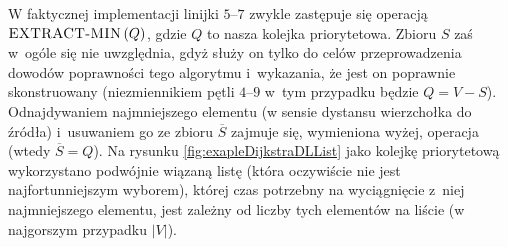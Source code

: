 W faktycznej implementacji linijki $5$--$7$ zwykle zastępuje się operacją $\textrm{\textsc{EXTRACT-MIN}} \left( Q \right)$, gdzie $Q$ to nasza kolejka priorytetowa. Zbioru $S$ zaś w~ogóle się nie uwzględnia, gdyż służy on tylko do celów przeprowadzenia dowodów poprawności tego algorytmu i~wykazania, że jest on poprawnie skonstruowany (niezmiennikiem pętli $4$--$9$ w~tym przypadku będzie $Q = V - S$). Odnajdywaniem najmniejszego elementu (w sensie dystansu wierzchołka do źródła) i~usuwaniem go ze zbioru $\overline{S}$ zajmuje się, wymieniona wyżej, operacja (wtedy $\overline{S} = Q$). Na rysunku \ref{fig:exapleDijkstraDLList} jako kolejkę priorytetową wykorzystano podwójnie wiązaną listę (która oczywiście nie jest najfortunniejszym wyborem), której czas potrzebny na wyciągnięcie z~niej najmniejszego elementu, jest zależny od liczby tych elementów na liście (w najgorszym przypadku $ \left| V \right| $).

